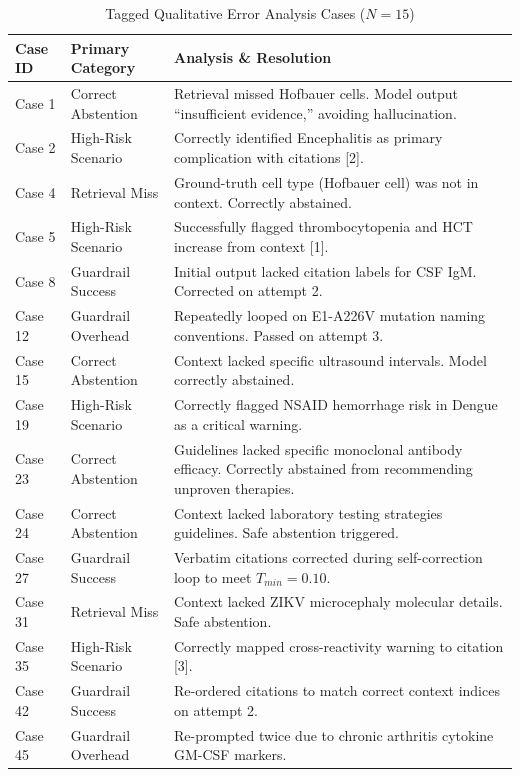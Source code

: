 \documentclass[sn-mathphys,Numbered]{sn-jnl}%
\begin{document}
\begin{table}[ht]
\centering
\caption{Tagged Qualitative Error Analysis Cases ($N=15$)}
\label{tab4}
\begin{tabular}{lp{3.5cm}p{6cm}}
\toprule
Case ID & Primary Category & Analysis \& Resolution \\
\midrule
Case 1 & Correct Abstention & Retrieval missed Hofbauer cells. Model output ``insufficient evidence,'' avoiding hallucination. \\
Case 2 & High-Risk Scenario & Correctly identified Encephalitis as primary complication with citations [2]. \\
Case 4 & Retrieval Miss & Ground-truth cell type (Hofbauer cell) was not in context. Correctly abstained. \\
Case 5 & High-Risk Scenario & Successfully flagged thrombocytopenia and HCT increase from context [1]. \\
Case 8 & Guardrail Success & Initial output lacked citation labels for CSF IgM. Corrected on attempt 2. \\
Case 12 & Guardrail Overhead & Repeatedly looped on E1-A226V mutation naming conventions. Passed on attempt 3. \\
Case 15 & Correct Abstention & Context lacked specific ultrasound intervals. Model correctly abstained. \\
Case 19 & High-Risk Scenario & Correctly flagged NSAID hemorrhage risk in Dengue as a critical warning. \\
Case 23 & Correct Abstention & Guidelines lacked specific monoclonal antibody efficacy. Correctly abstained from recommending unproven therapies. \\
Case 24 & Correct Abstention & Context lacked laboratory testing strategies guidelines. Safe abstention triggered. \\
Case 27 & Guardrail Success & Verbatim citations corrected during self-correction loop to meet $T_{min}=0.10$. \\
Case 31 & Retrieval Miss & Context lacked ZIKV microcephaly molecular details. Safe abstention. \\
Case 35 & High-Risk Scenario & Correctly mapped cross-reactivity warning to citation [3]. \\
Case 42 & Guardrail Success & Re-ordered citations to match correct context indices on attempt 2. \\
Case 45 & Guardrail Overhead & Re-prompted twice due to chronic arthritis cytokine GM-CSF markers. \\
\bottomrule
\end{tabular}
\end{table}
\end{document}
